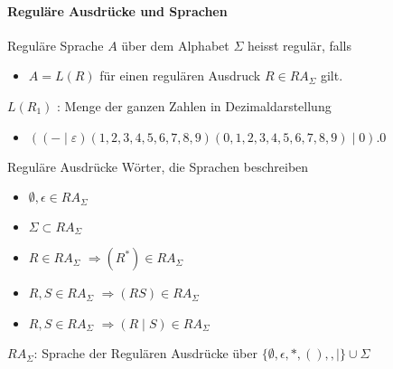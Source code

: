 \paragraph{Reguläre Ausdrücke und Sprachen}
\begin{definition}{Reguläre Sprache}
    $A$ über dem Alphabet $\Sigma$ heisst regulär, falls
    \begin{itemize}
        \item $A=L(R)$ für einen regulären Ausdruck $R \in R A_{\Sigma}$ gilt.
    \end{itemize}
    $L\left(R_{1}\right)$ : Menge der ganzen Zahlen in Dezimaldarstellung
    \begin{itemize}
    \item $((-\mid \varepsilon)(1,2,3,4,5,6,7,8,9)(0,1,2,3,4,5,6,7,8,9) \mid 0) .0$
    \end{itemize}
\end{definition}    

\begin{concept}{Reguläre Ausdrücke}
    Wörter, die Sprachen beschreiben
    
    \begin{minipage}{0.3\linewidth}
        \begin{itemize}
            \item $\emptyset, \epsilon \in R A_{\Sigma}$
            \item $\Sigma \subset R A_{\Sigma}$
        \end{itemize}
    \end{minipage}
    \begin{minipage}{0.5\linewidth}
    \begin{itemize}
        \item $R \in R A_{\Sigma}$  $\Rightarrow\left(R^{*}\right) \in R A_{\Sigma}$
        \item $R, S \in R A_{\Sigma}$ $\Rightarrow(R S) \in R A_{\Sigma}$
        \item $R, S \in R A_{\Sigma}$ $\Rightarrow(R \mid S) \in R A_{\Sigma}$   
    \end{itemize}
    \end{minipage}

    $R A_{\Sigma}$: Sprache der Regulären Ausdrücke über $\{\emptyset, \epsilon, *,(),, \mid\} \cup \Sigma$ 
\end{concept}






